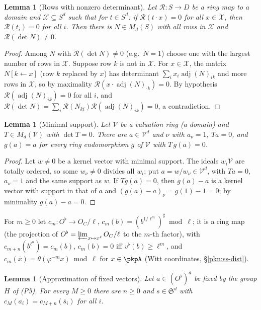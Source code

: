 \documentclass[10pt]{amsart}
\newtheorem{lemma}[theorem]{Lemma}
\theoremstyle{definition}
\theoremstyle{remark}
\begin{document}
\begin{lemma}[Rows with nonzero determinant]\label{pkf:rows}
Let $\mathcal R\colon S\to D$ be a ring map to a domain and $\mathcal X\subseteq S^d$ such that for
$t\in S^d$: if $\mathcal R(t\cdot x)=0$ for all $x\in\mathcal X$, then $\mathcal R(t_i)=0$ for all $i$.
Then there is $N\in M_d(S)$ with all rows in $\mathcal X$ and $\mathcal R(\det N)\ne0$.
\end{lemma}

\begin{proof}
Among $N$ with $\mathcal R(\det N)\ne0$ (e.g.\ $N=1$) choose one with the largest number of rows in
$\mathcal X$. Suppose row $k$ is not in $\mathcal X$. For $x\in\mathcal X$, the matrix $N[k\leftarrow x]$
(row $k$ replaced by $x$) has determinant $\sum_ix_i\operatorname{adj}(N)_{ik}$ and more rows in
$\mathcal X$, so by maximality $\mathcal R(x\cdot\operatorname{adj}(N)_{\cdot k})=0$. By hypothesis
$\mathcal R(\operatorname{adj}(N)_{ik})=0$ for all $i$, and $\mathcal R(\det N)=\sum_i\mathcal R(N_{ki})
\mathcal R(\operatorname{adj}(N)_{ik})=0$, a contradiction.
\end{proof}

\begin{lemma}[Minimal support]\label{pkf:artin}
Let $\mathcal V$ be a valuation ring (a domain) and $T\in M_d(\mathcal V)$ with $\det T=0$. There are
$a\in\mathcal V^d$ and $\nu$ with $a_\nu=1$, $Ta=0$, and $g(a)=a$ for every ring endomorphism $g$ of
$\mathcal V$ with $T\,g(a)=0$.
\end{lemma}

\begin{proof}
Let $w\ne0$ be a kernel vector with minimal support. The ideals $w_i\mathcal V$ are totally ordered, so
some $w_\nu\ne0$ divides all $w_i$; put $a=w/w_\nu\in\mathcal V^d$, with $Ta=0$, $a_\nu=1$ and the same
support as $w$. If $Tg(a)=0$, then $g(a)-a$ is a kernel vector with support in that of $a$ and
$(g(a)-a)_\nu=g(1)-1=0$; by minimality $g(a)-a=0$.
\end{proof}

For $m\ge0$ let $c_m\colon O^\flat\to O_C/\ell$, $c_m(b)=(b^{1/\ell^m})^\sharp\bmod\ell$; it is a ring
map (the projection of $O^\flat=\varprojlim_{x\mapsto x^\ell}O_C/\ell$ to the $m$-th factor), with
$c_{m+n}(b^{\ell^n})=c_m(b)$, $c_m(b)=0$ iff $v^\flat(b)\ge\ell^m$, and $c_m(\bar x)=\theta(\varphi^{-m}x)
\bmod\ell$ for $x\in\pkpA$ (Witt coordinates, \S\ref{pkn:ss-dist}).

\begin{lemma}[Approximation of fixed vectors]\label{pkf:fixed}
Let $a\in(O^\flat)^d$ be fixed by the group $H$ of (P5). For every $M\ge0$ there are $n\ge0$ and
$s\in\mathfrak S^d$ with $c_M(a_i)=c_{M+n}(\bar s_i)$ for all $i$.
\end{lemma}
\end{document}
